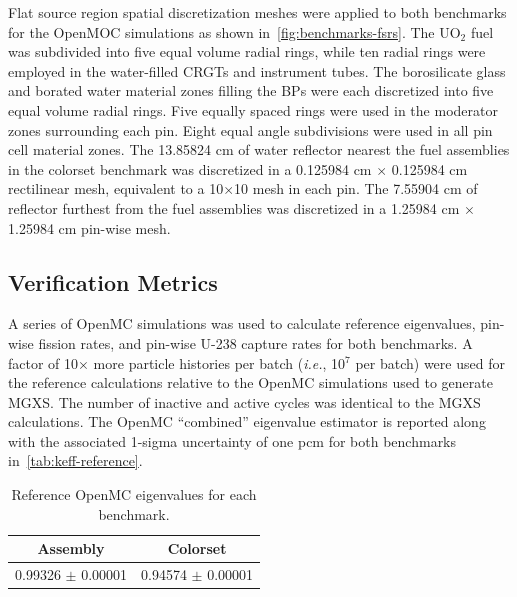 
Flat source region spatial discretization meshes were applied to both benchmarks for the OpenMOC simulations as shown in~\autoref{fig:benchmarks-fsrs}. The UO$_2$ fuel was subdivided into five equal volume radial rings, while ten radial rings were employed in the water-filled CRGTs and instrument tubes. The borosilicate glass and borated water material zones filling the BPs were each discretized into five equal volume radial rings. Five equally spaced rings were used in the moderator zones surrounding each pin. Eight equal angle subdivisions were used in all pin cell material zones. The 13.85824 cm of water reflector nearest the fuel assemblies in the colorset benchmark was discretized in a 0.125984 cm $\times$ 0.125984 cm rectilinear mesh, equivalent to a 10$\times$10 mesh in each pin. The 7.55904 cm of reflector furthest from the fuel assemblies was discretized in a 1.25984 cm $\times$ 1.25984 cm pin-wise mesh.

\subsection{Verification Metrics}
\label{subsec:metrics}

A series of OpenMC simulations was used to calculate reference eigenvalues, pin-wise fission rates, and pin-wise U-238 capture rates for both benchmarks. A factor of 10$\times$ more particle histories per batch (\textit{i.e.}, 10$^7$ per batch) were used for the reference calculations relative to the OpenMC simulations used to generate MGXS. The number of inactive and active cycles was identical to the MGXS calculations. The OpenMC ``combined'' eigenvalue estimator is reported along with the associated 1-sigma uncertainty of one pcm for both benchmarks in~\autoref{tab:keff-reference}.


\begin{table}[h!]
  \centering
  \caption{Reference OpenMC eigenvalues for each benchmark.}
  \label{tab:keff-reference} 
  \begin{tabular}{c c}
  \toprule
  {\bf Assembly} &
  {\bf Colorset} \\
  \midrule
  0.99326 $\pm$ 0.00001 & 0.94574 $\pm$ 0.00001 \\
  \bottomrule
\end{tabular}
\end{table}

